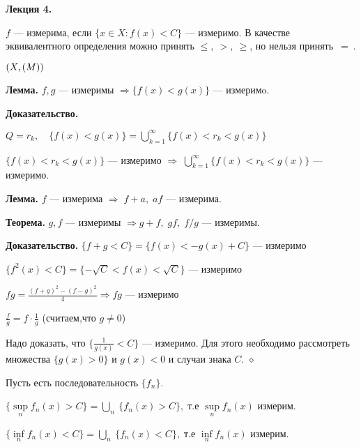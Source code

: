 
\begin{center}
\textbf{Лекция 4.}
\end{center}

$f$ --- измерима, если $\{ x \in X: f(x) < C\}$ --- измеримо. В
качестве эквивалентного определения можно принять $\leqslant, \:
>, \: \geqslant$, но нельзя принять~$=\:$.

$(X, \EuScript(M))$

\textbf{Лемма.} \quad $f, g$ --- измеримы $\Rightarrow \{f(x) <
g(x)\}$ --- измеримo.

\textbf{Доказательство.} \quad

$Q = {r_k}, \quad \{f(x)<g(x)\} = \bigcup_{k=1}^{\infty}\{f(x) <
r_k < g(x)\}$

$\{ f(x) < r_k < g(x)\}$ --- измеримо $\Rightarrow \;
\bigcup_{k=1}^{\infty}\{f(x) < r_k < g(x)\}$ --- измеримо.

\textbf{Лемма.} \quad $f$ --- измерима $\Rightarrow \; f+a, \;af$
--- измерима.

\textbf{Теорема.} \quad $g, f$ --- измеримы $\Rightarrow g + f,\;
gf,\; f/g$ --- измеримы.






\textbf{Доказательство.} \quad $\{ f + g < C\} = \{ f(x) < - g(x)
+ C\}$ --- измеримо

$\{ f^2(x) < C \} = \{ - \sqrt{C} < f(x) < \sqrt{C} \}$ ---
измеримо

$fg = \frac{(f + g)^2 - (f - g)^2}{4} \Rightarrow fg$ --- измеримо

$\frac{f}{g} = f\cdot \frac{1}{g}$  (считаем,что $g \neq 0$)

Надо доказать, что  $\{ \frac{1}{g(x)} < C \}$ --- измеримо. Для
этого необходимо рассмотреть множества $\{ g(x) > 0\}$ и $g(x) < 0
$ и случаи знака $C$. $\diamond$


Пусть есть последовательность $\{ f_n\}$.

$\{ \sup\limits_n f_n(x) > C\} = \bigcup\limits_n\: \{f_n (x) >
C\} , \; \mbox{т.е } \sup\limits_n f_n(x)$ измерим.

$\{ \inf\limits_n f_n(x) < C\} = \bigcup\limits_n\: \{f_n (x) <C\}
, \; \mbox{т.е } \inf\limits_n f_n(x)$ измерим.

